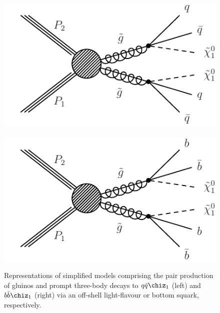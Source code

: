 \begin{figure}[thb]
\centering
\includegraphics[width=0.45\linewidth]{T1qqqq.pdf} \,
\includegraphics[width=0.45\linewidth]{T1bbbb.pdf}
\caption{Representations of simplified models comprising the pair
  production of gluinos and prompt three-body decays to
  $q\bar{q}\chiz_{1}$ (left) and $b\bar{b}\chiz_{1}$ (right) via an
  off-shell light-flavour or bottom squark, respectively.}
\label{fig:feyn}
\end{figure}


